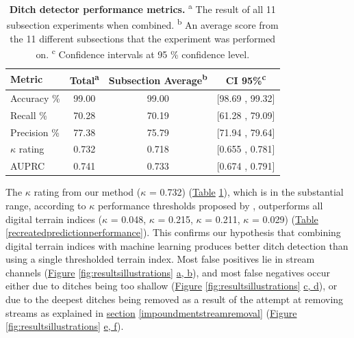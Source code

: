 \documentclass[11pt, review]{elsarticle} %
\begin{document}
\begin{table}[!htb]
\centering
    {\begin{tabular}{lccc}
        \textbf{Metric} & \textbf{Total}\textsuperscript{a} & \textbf{Subsection Average}\textsuperscript{b}& \textbf{CI 95\%}\textsuperscript{c} \\ 
        \hline
        Accuracy     \% & 99.00 & 99.00 & [98.69 , 99.32] \\
        Recall       \% & 70.28 & 70.19 & [61.28 , 79.09] \\
        Precision    \% & 77.38 & 75.79 & [71.94 , 79.64] \\
        $\kappa$ rating & 0.732 & 0.718 & [0.655 , 0.781] \\
        AUPRC           & 0.741 & 0.733 & [0.674 , 0.791] \\
        \hline
    \end{tabular}}
    \caption{\textbf{Ditch detector performance metrics.} \newline
    \textsuperscript{a} The result of all 11 subsection experiments when combined. \newline
    \textsuperscript{b} An average score from the 11 different subsections that the experiment was performed on. \newline
    \textsuperscript{c} Confidence intervals at 95 \% confidence level.}
    \label{predictionperformance}
\end{table}

The $\kappa$ rating from our method ($\kappa$ = 0.732) (\hyperref[predictionperformance]{Table} \ref{predictionperformance}), which is in the substantial range, according to $\kappa$ performance thresholds proposed by \citet{kappaanalysis}, outperforms all digital terrain indices ($\kappa$ = 0.048, $\kappa$ = 0.215, $\kappa$ = 0.211, $\kappa$ = 0.029) (\hyperref[recreatedpredictionperformance]{Table} \ref{recreatedpredictionperformance}). This confirms our hypothesis that combining digital terrain indices with machine learning produces better ditch detection than using a single thresholded terrain index. Most false positives lie in stream channels (\hyperref[fig:resultsillustrations]{Figure} \ref{fig:resultsillustrations} \hyperref[fig:resultsillustrations]{a, b}), and most false negatives occur either due to ditches being too shallow (\hyperref[fig:resultsillustrations]{Figure} \ref{fig:resultsillustrations} \hyperref[fig:resultsillustrations]{c, d}), or due to the deepest ditches being removed as a result of the attempt at removing streams as explained in \hyperref[impoundmentstreamremoval]{section} \ref{impoundmentstreamremoval} (\hyperref[fig:resultsillustrations]{Figure} \ref{fig:resultsillustrations} \hyperref[fig:resultsillustrations]{e, f}).
\end{document}
